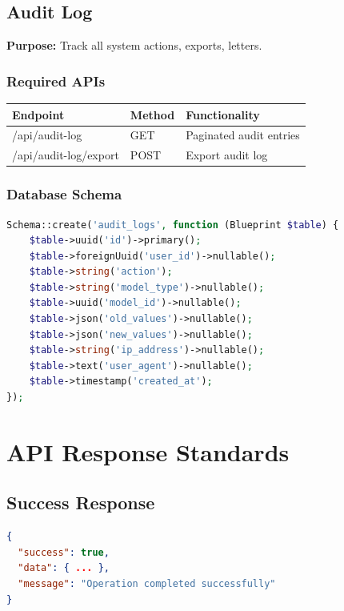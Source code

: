 \documentclass[11pt,a4paper]{article}
\begin{document}
\subsection{Audit Log}

\textbf{Purpose:} Track all system actions, exports, letters.

\subsubsection{Required APIs}

\begin{longtable}{|p{5cm}|p{2cm}|p{6cm}|}
\hline
\textbf{Endpoint} & \textbf{Method} & \textbf{Functionality} \\
\hline
/api/audit-log & GET & Paginated audit entries \\
/api/audit-log/export & POST & Export audit log \\
\hline
\end{longtable}

\subsubsection{Database Schema}
\begin{lstlisting}[language=php]
Schema::create('audit_logs', function (Blueprint $table) {
    $table->uuid('id')->primary();
    $table->foreignUuid('user_id')->nullable();
    $table->string('action');
    $table->string('model_type')->nullable();
    $table->uuid('model_id')->nullable();
    $table->json('old_values')->nullable();
    $table->json('new_values')->nullable();
    $table->string('ip_address')->nullable();
    $table->text('user_agent')->nullable();
    $table->timestamp('created_at');
});
\end{lstlisting}

\newpage

\section{API Response Standards}

\subsection{Success Response}
\begin{lstlisting}[language=json]
{
  "success": true,
  "data": { ... },
  "message": "Operation completed successfully"
}
\end{lstlisting}
\end{document}
